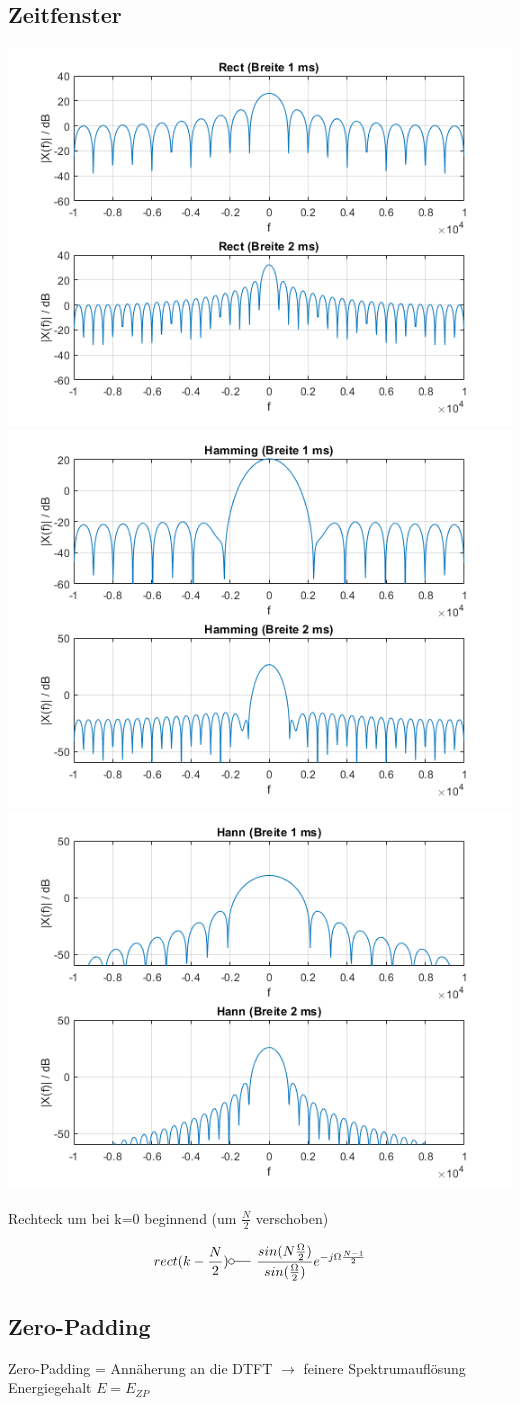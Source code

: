 \documentclass[10pt,a4paper]{article}
\begin{document}
\subsection{Zeitfenster}
  \begin{center}
      \includegraphics[width=.16\textwidth]{./img/rect.png}
      \includegraphics[width=.15\textwidth]{./img/hamming.png}
      \includegraphics[width=.16\textwidth]{./img/hann.png}
  \end{center}
  Rechteck um bei k=0 beginnend (um $\frac{N}{2}$ verschoben)
  \begin{mdframed}[style=exercise]
    \begin{align}
        rect(k-\frac{N}{2}) \fourier \frac{sin(N\frac{\Omega}{2})}{sin(\frac{\Omega}{2})} e^{-j\Omega\frac{N-1}{2}}
    \end{align}
  \end{mdframed}
\subsection{Zero-Padding}
Zero-Padding = Annäherung an die DTFT $\rightarrow$ feinere Spektrumauflösung Energiegehalt $E = E_{ZP}$ \\
\end{document}
